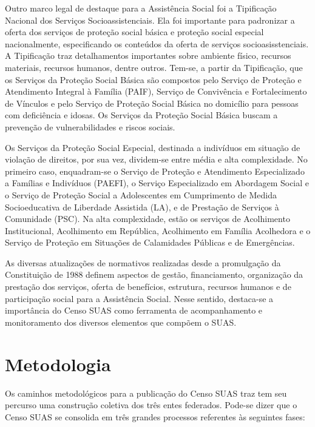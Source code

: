 \documentclass[
  brazilian]{report}
\begin{document}
Outro marco legal de destaque para a Assistência Social foi a
Tipificação Nacional dos Serviços Socioassistenciais. Ela foi importante
para padronizar a oferta dos serviços de proteção social básica e
proteção social especial nacionalmente, especificando os conteúdos da
oferta de serviços socioasisstenciais. A Tipificação traz detalhamentos
importantes sobre ambiente físico, recursos materiais, recursos humanos,
dentre outros. Tem-se, a partir da Tipificação, que os Serviços da
Proteção Social Básica são compostos pelo Serviço de Proteção e
Atendimento Integral à Família (PAIF), Serviço de Convivência e
Fortalecimento de Vínculos e pelo Serviço de Proteção Social Básica no
domicílio para pessoas com deficiência e idosas. Os Serviços da Proteção
Social Básica buscam a prevenção de vulnerabilidades e riscos sociais.

Os Serviços da Proteção Social Especial, destinada a indivíduos em
situação de violação de direitos, por sua vez, dividem-se entre média e
alta complexidade. No primeiro caso, enquadram-se o Serviço de Proteção
e Atendimento Especializado a Famílias e Indivíduos (PAEFI), o Serviço
Especializado em Abordagem Social e o Serviço de Proteção Social a
Adolescentes em Cumprimento de Medida Socioeducativa de Liberdade
Assistida (LA), e de Prestação de Serviços à Comunidade (PSC). Na alta
complexidade, estão os serviços de Acolhimento Institucional,
Acolhimento em República, Acolhimento em Família Acolhedora e o Serviço
de Proteção em Situações de Calamidades Públicas e de Emergências.

As diversas atualizações de normativos realizadas desde a promulgação da
Constituição de 1988 definem aspectos de gestão, financiamento,
organização da prestação dos serviços, oferta de benefícios, estrutura,
recursos humanos e de participação social para a Assistência Social.
Nesse sentido, destaca-se a importância do Censo SUAS como ferramenta de
acompanhamento e monitoramento dos diversos elementos que compõem o
SUAS.

\hypertarget{metodologia}{%
\chapter{Metodologia}\label{metodologia}}

Os caminhos metodológicos para a publicação do Censo SUAS traz tem seu
percurso uma construção coletiva dos três entes federados. Pode-se dizer
que o Censo SUAS se consolida em três grandes processos referentes às
seguintes fases:
\end{document}
